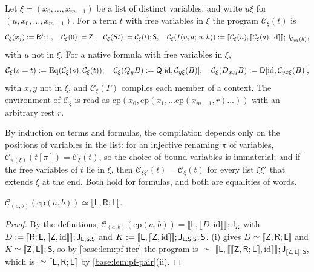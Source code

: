 \begin{definition}[Compilation]
\label{base:def:pf-compile}
Let $\xi=(x_0,\dots,x_{m-1})$ be a list of distinct variables, and write
$u\xi$ for $(u,x_0,\dots,x_{m-1})$.  For a term $t$ with free variables in
$\xi$ the program $\mathcal C_\xi(t)$ is
\[
 \mathcal C_\xi(x_j)\mathrel{:=}\mathsf R^{j};\mathsf L,\quad
 \mathcal C_\xi(0)\mathrel{:=}\mathsf Z,\quad
 \mathcal C_\xi(S t)\mathrel{:=}\mathcal C_\xi(t);\mathsf S,\quad
 \mathcal C_\xi(I(n,a;\,u.\,h))\mathrel{:=}
 [\![\mathcal C_\xi(n),[\![\mathcal C_\xi(a),\mathrm{id}]\!]]\!];
 \mathsf J_{\mathcal C_{u\xi}(h)},
\]
with $u$ not in $\xi$.  For a native formula with free variables in $\xi$,
\[
 \mathcal C_\xi(s=t)\mathrel{:=}\mathrm{Eq}(\mathcal C_\xi(s),\mathcal C_\xi(t)),\quad
 \mathcal C_\xi(Q_{y}B)\mathrel{:=}\mathsf Q[\mathrm{id},\mathcal C_{y\xi}(B)],\quad
 \mathcal C_\xi(D_{x,y}B)\mathrel{:=}\mathsf D[\mathrm{id},\mathcal C_{yx\xi}(B)],
\]
with $x,y$ not in $\xi$, and $\mathcal C_\xi(\Gamma)$ compiles each member
of a context.  The environment of $\mathcal C_\xi$ is read as
$\mathrm{cp}(x_0,\mathrm{cp}(x_1,\dots\mathrm{cp}(x_{m-1},r)\dots))$ with an
arbitrary rest $r$.
\end{definition}

By induction on terms and formulas, the compilation depends only on the
positions of variables in the list: for an injective renaming $\pi$ of
variables, $\mathcal C_{\pi(\xi)}(t[\pi])=\mathcal C_\xi(t)$, so the choice
of bound variables is immaterial; and if the free variables of $t$ lie in
$\xi$, then $\mathcal C_{\xi\xi'}(t)=\mathcal C_\xi(t)$ for every list
$\xi\xi'$ that extends $\xi$ at the end.  Both hold for formulas, and both
are equalities of words.

\begin{lemma}
\label{base:lem:pf-cp}
$\mathcal C_{(a,b)}(\mathrm{cp}(a,b))\simeq\llbracket\mathsf L,\mathsf R;\mathsf L\rrbracket$.
\end{lemma}

\begin{proof}
By the definitions,
$\mathcal C_{(a,b)}(\mathrm{cp}(a,b))=\llbracket\mathsf L,\llbracket D,\mathrm{id}\rrbracket\rrbracket;
\mathsf J_K$ with
$D\mathrel{:=}[\![\mathsf R;\mathsf L,[\![\mathsf Z,\mathrm{id}]\!]]\!];
\mathsf J_{\mathsf L;\mathsf S;\mathsf S}$ and
$K\mathrel{:=}[\![\mathsf L,[\![\mathsf Z,\mathrm{id}]\!]]\!];
\mathsf J_{\mathsf L;\mathsf S;\mathsf S};\mathsf S$.
(i) gives $D\simeq\llbracket\mathsf Z,\mathsf R;\mathsf L\rrbracket$
and $K\simeq\llbracket\mathsf Z,\mathsf L\rrbracket;\mathsf S$, so by
\cref{base:lem:pf-iter} the program is $\simeq$
$\llbracket\mathsf L,\llbracket\llbracket\mathsf Z,\mathsf R;\mathsf L\rrbracket,
\mathrm{id}\rrbracket\rrbracket;\mathsf J_{\llbracket\mathsf Z,\mathsf L\rrbracket;\mathsf S}$,
which is $\simeq\llbracket\mathsf L,\mathsf R;\mathsf L\rrbracket$ by
\cref{base:lem:pf-pair}(ii).
\end{proof}

